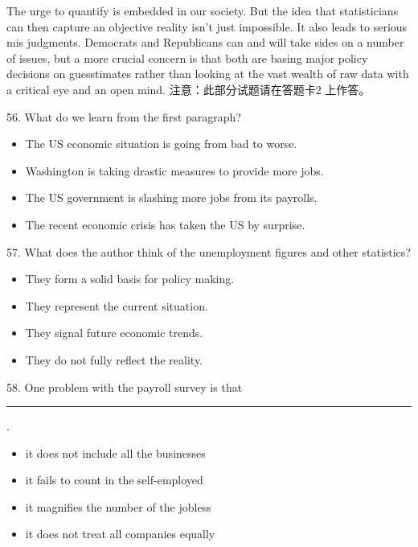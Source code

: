 \documentclass[UTF8,11pt]{ctexart}
\begin{document}
The urge to quantify is embedded in our society. But the idea that statisticians can then capture an objective reality isn’t just impossible. It also leads to serious mis judgments. Democrats and Republicans can and will take sides on a number of issues, but a more crucial concern is that both are basing major policy decisions on guesstimates rather than looking at the vast wealth of raw data with a critical eye and an open mind. 注意：此部分试题请在答题卡2 上作答。


56. What do we learn from the first paragraph?


\begin{itemize}[leftmargin=2em,itemsep=.2em,topsep=.4em]\item[A.] The US economic situation is going from bad to worse.
\item[B.] Washington is taking drastic measures to provide more jobs.
\item[C.] The US government is slashing more jobs from its payrolls.
\item[D.] The recent economic crisis has taken the US by surprise.
\end{itemize}

57. What does the author think of the unemployment figures and other statistics?


\begin{itemize}[leftmargin=2em,itemsep=.2em,topsep=.4em]\item[A.] They form a solid basis for policy making.
\item[B.] They represent the current situation.
\item[C.] They signal future economic trends.
\item[D.] They do not fully reflect the reality.
\end{itemize}

58. One problem with the payroll survey is that\par\noindent\rule{.95\linewidth}{.4pt}\par  .


\begin{itemize}[leftmargin=2em,itemsep=.2em,topsep=.4em]\item[A.] it does not include all the businesses
\item[B.] it fails to count in the self-employed
\item[C.] it magnifies the number of the jobless
\item[D.] it does not treat all companies equally
\end{itemize}
\end{document}
